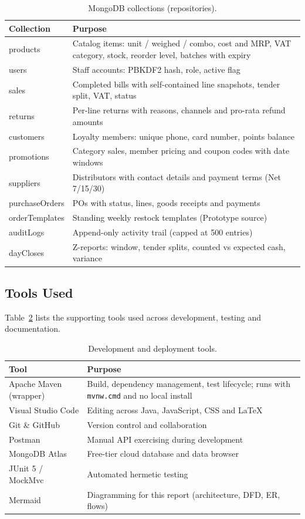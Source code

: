 \documentclass[12pt,a4paper]{report}
\begin{document}
\begin{table}[H]
\centering
\caption{MongoDB collections (repositories).}
\label{tab:collections}
\small
\begin{tabularx}{\textwidth}{l X}
\toprule
\textbf{Collection} & \textbf{Purpose} \\
\midrule
products & Catalog items: unit / weighed / combo, cost and MRP, VAT category, stock,
reorder level, batches with expiry \\
users & Staff accounts: PBKDF2 hash, role, active flag \\
sales & Completed bills with self-contained line snapshots, tender split, VAT, status \\
returns & Per-line returns with reasons, channels and pro-rata refund amounts \\
customers & Loyalty members: unique phone, card number, points balance \\
promotions & Category sales, member pricing and coupon codes with date windows \\
suppliers & Distributors with contact details and payment terms (Net 7/15/30) \\
purchaseOrders & POs with status, lines, goods receipts and payments \\
orderTemplates & Standing weekly restock templates (Prototype source) \\
auditLogs & Append-only activity trail (capped at 500 entries) \\
dayCloses & Z-reports: window, tender splits, counted vs expected cash, variance \\
\bottomrule
\end{tabularx}
\end{table}

\subsection{Tools Used}
Table~\ref{tab:tools} lists the supporting tools used across development, testing and
documentation.

\begin{table}[H]
\centering
\caption{Development and deployment tools.}
\label{tab:tools}
\small
\begin{tabularx}{\textwidth}{l X}
\toprule
\textbf{Tool} & \textbf{Purpose} \\
\midrule
Apache Maven (wrapper) & Build, dependency management, test lifecycle; runs with
\texttt{mvnw.cmd} and no local install \\
Visual Studio Code & Editing across Java, JavaScript, CSS and LaTeX \\
Git \& GitHub & Version control and collaboration \\
Postman & Manual API exercising during development \\
MongoDB Atlas & Free-tier cloud database and data browser \\
JUnit 5 / MockMvc & Automated hermetic testing \\
Mermaid & Diagramming for this report (architecture, DFD, ER, flows) \\
\bottomrule
\end{tabularx}
\end{table}
\end{document}
